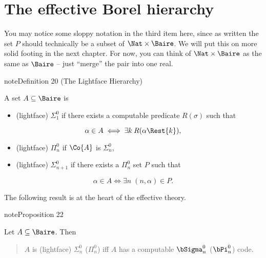 \documentclass[letterpaper,10pt,english]{jupyterBook}
\begin{document}
\section{The effective Borel hierarchy}
\label{\detokenize{codingBorel:the-effective-borel-hierarchy}}
\begin{sphinxShadowBox}
\sphinxstylesidebartitle{}

\sphinxAtStartPar
You may notice some sloppy notation in the third item here, since as written the set \(P\) should technically be a subset of \(\Nat\times \Baire\). We will put this on more solid footing in the next chapter. For now, you can think of \(\Nat \times \Baire\) as the same as \(\Baire\) – just “merge” the pair into one real.
\end{sphinxShadowBox}
\label{codingBorel:def-effective-Borel}
\begin{sphinxadmonition}{note}{Definition 20 (The Lightface Hierarchy)}



\sphinxAtStartPar
A set \(A \subseteq \Baire\) is
\begin{itemize}
\item {} 
\sphinxAtStartPar
(lightface) \(\Sigma^0_1\) if there exists a computable predicate \(R(\sigma)\) such that

\end{itemize}
\begin{equation*}
    \alpha \in A \iff \exists k \: R(\alpha\Rest{k}),
\end{equation*}\begin{itemize}
\item {} 
\sphinxAtStartPar
(lightface) \(\Pi^0_n\) if \(\Co{A}\) is \(\Sigma^0_n\),

\item {} 
\sphinxAtStartPar
(lightface) \(\Sigma^0_{n+1}\) if there exists a \(\Pi^0_n\) set \(P\) such that

\end{itemize}
\begin{equation*}
    \alpha \in A \iff \exists n \; (n,\alpha) \in P. 
\end{equation*}\end{sphinxadmonition}

\sphinxAtStartPar
The following result is at the heart of the effective theory.
\label{codingBorel:prop-computable-codes}
\begin{sphinxadmonition}{note}{Proposition 22}



\sphinxAtStartPar
Let \(A \subseteq \Baire\). Then
\begin{quote}

\sphinxAtStartPar
\(A\) is (lightface) \(\Sigma^0_n\) (\(\Pi^0_n\)) iff \(A\) has a computable \(\bSigma^0_n\) (\(\bPi^0_n\)) code.
\end{quote}
\end{sphinxadmonition}
\end{document}
